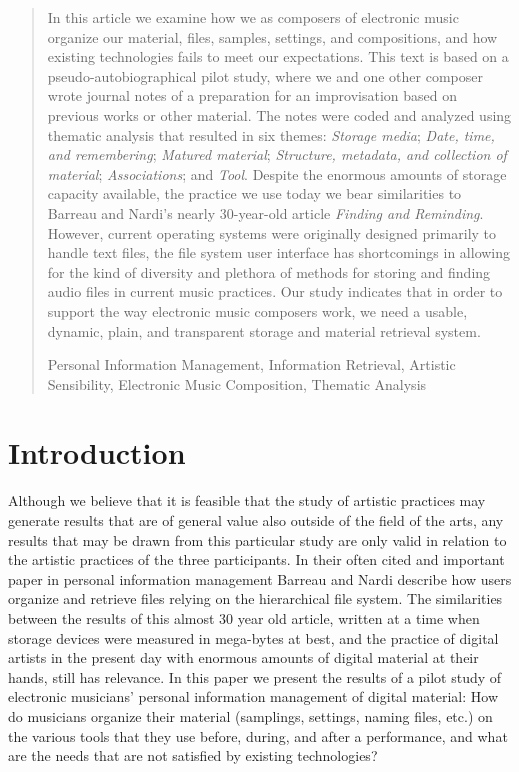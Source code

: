 \documentclass[runningheads,a4paper]{cmmr2023}
\newcommand{\keywords}[1]{\par\addvspace\baselineskip
\noindent\keywordname\enspace\ignorespaces#1}
\begin{document}
\begin{abstract}
In this article we examine how we as composers of electronic music organize our material, files, samples, settings, and compositions, and how existing technologies fails to meet our expectations. This text is based on a pseudo-autobiographical pilot study, where we and one other composer wrote journal notes of a preparation for an improvisation based on previous works or other material. The notes were coded and analyzed using thematic analysis that resulted in six themes: \emph{Storage media}; \emph{Date, time, and remembering}; \emph{Matured material}; \emph{Structure, metadata, and collection of material}; \emph{Associations}; and \emph{Tool}. Despite the enormous amounts of storage capacity available, the practice we use today we bear similarities to Barreau and Nardi's \cite{Barreau1995} nearly 30-year-old article \emph{Finding and Reminding}. However, current operating systems were originally designed primarily to handle text files, the file system user interface has shortcomings in allowing for the kind of diversity and plethora of methods for storing and finding audio files in current music practices. Our study indicates that in order to support the way electronic music composers work, we need a usable, dynamic, plain, and transparent storage and material retrieval system.

\keywords{Personal Information Management, Information Retrieval, Artistic Sensibility, Electronic Music Composition, Thematic Analysis}
\end{abstract}

\section{Introduction}
Although we believe that it is feasible that the study of artistic practices may generate results that are of general value also outside of the field of the arts, any results that may be drawn from this particular study are only valid in relation to the artistic practices of the three participants. 
In their often cited and important paper in personal information management Barreau and Nardi \cite{Barreau1995} describe how users organize and retrieve files relying on the hierarchical file system. The similarities between the results of this almost 30 year old article, written at a time when storage devices were measured in mega-bytes at best, and the practice of digital artists in the present day with enormous amounts of digital material at their hands, still has relevance. In this paper we present the results of a pilot study of electronic musicians' personal information management of digital material: How do musicians organize their material (samplings, settings, naming files, etc.) on the various tools that they use before, during, and after a performance, and what are the needs that are not satisfied by existing technologies?
\end{document}
